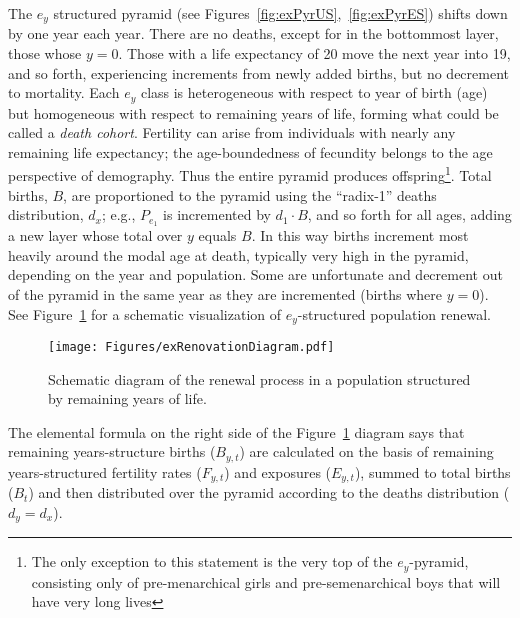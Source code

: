  \FloatBarrier
\label{sec:exrenewal}
The $e_y$ structured pyramid (see Figures~\ref{fig:exPyrUS},~\ref{fig:exPyrES})
shifts down by one year each year. There are no deaths, except for in 
the bottommost layer, those whose $y = 0$. Those with a life
expectancy of 20 move the next year into 19, and so forth, experiencing
increments from newly added births, but no decrement to mortality. 
Each $e_y$ class is heterogeneous with 
respect to year of birth (age) but homogeneous with respect to remaining 
years of life, forming what could be called a \textit{death cohort}. Fertility
can arise from individuals with nearly any remaining life expectancy; the 
age-boundedness of fecundity belongs to the age
perspective of demography. Thus the entire pyramid produces 
offspring\footnote{The only exception
to this statement is the very top of the $e_y$-pyramid, consisting only of
pre-menarchical girls and pre-semenarchical boys that will have very long
lives}. Total births, $B$, are proportioned to the pyramid using the ``radix-1''
deaths distribution, $d_x$; e.g., $P_{e_1}$ is incremented by $d_1 \cdot B$, and
so forth for all ages, adding a new layer whose total over $y$ equals $B$. In 
this way births
increment most heavily around the modal age at death, typically very high in the
pyramid, depending on the year and population. Some are
unfortunate and decrement out of the pyramid in the same year as they are
incremented (births where $y = 0$). See Figure~\ref{fig:exrenewal} for a
schematic visualization of $e_y$-structured population renewal.

\begin{figure}[ht!]
\begin{adjustwidth}{-1in}{1in}
        \centering  
          \caption{Schematic diagram of the renewal process in a population
          structured by remaining years of life.}
           \texttt{[image: Figures/exRenovationDiagram.pdf]}
          \label{fig:exrenewal}
          \end{adjustwidth}
\end{figure}

The elemental formula on the right side of the Figure~\ref{fig:exrenewal}
diagram says that remaining years-structure births ($B_{y,t}$) are calculated on
the basis of remaining years-structured fertility rates ($F_{y,t}$) and
exposures ($E_{y,t}$), summed to total births ($B_t$) and then distributed over
the pyramid according to the deaths distribution ($d_y = d_x$).
